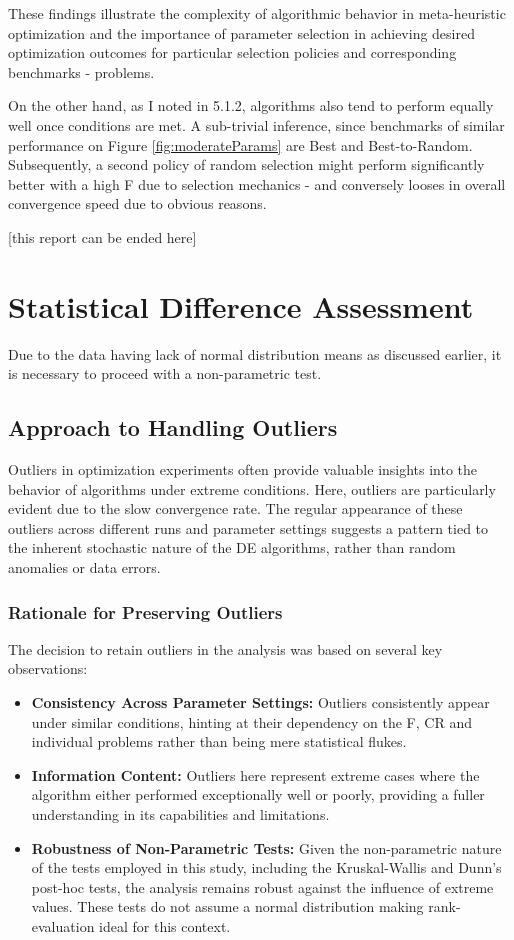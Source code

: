 \documentclass[12pt,a4paper]{article}
\begin{document}
These findings illustrate the complexity of algorithmic behavior in meta-heuristic optimization and the importance of parameter selection in achieving desired optimization outcomes for particular selection policies and corresponding benchmarks - problems.

On the other hand, as I noted in 5.1.2, algorithms also tend to perform equally well once conditions are met. A sub-trivial inference, since benchmarks of similar performance on Figure \ref{fig:moderateParams} are Best and Best-to-Random. Subsequently, a second policy of random selection might perform significantly better with a high F due to selection mechanics - and conversely looses in overall convergence speed due to obvious reasons.

[this report can be ended here]

\newpage

\section{Statistical Difference Assessment}

Due to the data having lack of normal distribution means as discussed earlier, it is necessary to proceed with a non-parametric test.

\subsection{Approach to Handling Outliers}
\label{subsec:outliers}

Outliers in optimization experiments often provide valuable insights into the behavior of algorithms under extreme conditions. Here, outliers are particularly evident due to the slow convergence rate. The regular appearance of these outliers across different runs and parameter settings suggests a pattern tied to the inherent stochastic nature of the DE algorithms, rather than random anomalies or data errors.

\subsubsection{Rationale for Preserving Outliers}
The decision to retain outliers in the analysis was based on several key observations:
\begin{itemize}
    \item \textbf{Consistency Across Parameter Settings:} Outliers consistently appear under similar conditions, hinting at their dependency on the F, CR and individual problems rather than being mere statistical flukes.
    \item \textbf{Information Content:} Outliers here represent extreme cases where the algorithm either performed exceptionally well or poorly, providing a fuller understanding in its capabilities and limitations.
    \item \textbf{Robustness of Non-Parametric Tests:} Given the non-parametric nature of the tests employed in this study, including the Kruskal-Wallis and Dunn's post-hoc tests, the analysis remains robust against the influence of extreme values. These tests do not assume a normal distribution making rank-evaluation ideal for this context.
\end{itemize}
\end{document}
